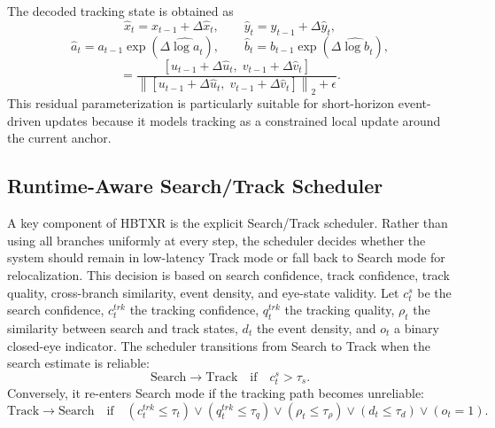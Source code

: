 ﻿\documentclass[journal]{IEEEtran}
\begin{document}
The decoded tracking state is obtained as
\begin{equation}
\hat{x}_t = x_{t-1} + \Delta \hat{x}_t, \qquad
\hat{y}_t = y_{t-1} + \Delta \hat{y}_t,
\label{eq:track_xy}
\end{equation}
\begin{equation}
\hat{a}_t = a_{t-1}\exp(\Delta \widehat{\log a}_t), \qquad
\hat{b}_t = b_{t-1}\exp(\Delta \widehat{\log b}_t),
\label{eq:track_ab}
\end{equation}
\begin{equation}
[\hat{u}_t,\hat{v}_t]
=
\frac{
[u_{t-1} + \Delta \hat{u}_t,\; v_{t-1} + \Delta \hat{v}_t]
}{
\left\|
[u_{t-1} + \Delta \hat{u}_t,\; v_{t-1} + \Delta \hat{v}_t]
\right\|_2 + \epsilon
}.
\label{eq:track_uv}
\end{equation}
This residual parameterization is particularly suitable for short-horizon event-driven updates because it models tracking as a constrained local update around the current anchor.

\subsection{Runtime-Aware Search/Track Scheduler}

A key component of HBTXR is the explicit Search/Track scheduler. Rather than using all branches uniformly at every step, the scheduler decides whether the system should remain in low-latency Track mode or fall back to Search mode for relocalization. This decision is based on search confidence, track confidence, track quality, cross-branch similarity, event density, and eye-state validity. Let \(c^s_t\) be the search confidence, \(c^{trk}_t\) the tracking confidence, \(q^{trk}_t\) the tracking quality, \(\rho_t\) the similarity between search and track states, \(d_t\) the event density, and \(o_t\) a binary closed-eye indicator. The scheduler transitions from Search to Track when the search estimate is reliable:
\begin{equation}
\text{Search} \rightarrow \text{Track}
\quad \text{if} \quad
c^s_t > \tau_s.
\label{eq:scheduler_st}
\end{equation}
Conversely, it re-enters Search mode if the tracking path becomes unreliable:
\begin{equation}
\text{Track} \rightarrow \text{Search}
\quad \text{if} \quad
\left(c^{trk}_t \le \tau_t\right)
\vee
\left(q^{trk}_t \le \tau_q\right)
\vee
\left(\rho_t \le \tau_{\rho}\right)
\vee
\left(d_t \le \tau_d\right)
\vee
(o_t = 1).
\label{eq:scheduler_ts}
\end{equation}
\end{document}
